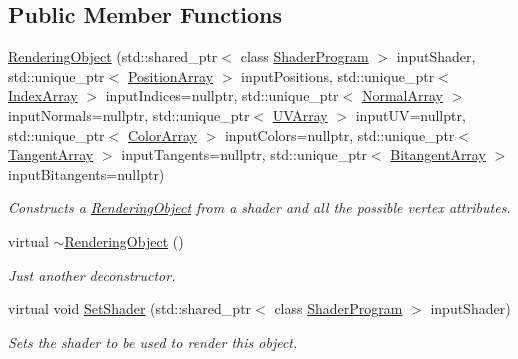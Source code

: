 \subsection*{Public Member Functions}
\begin{DoxyCompactItemize}
\item 
\hyperlink{class_rendering_object_ab5e3376ea0eb6290cdc55750a420b9d1}{Rendering\+Object} (std\+::shared\+\_\+ptr$<$ class \hyperlink{class_shader_program}{Shader\+Program} $>$ input\+Shader, std\+::unique\+\_\+ptr$<$ \hyperlink{class_rendering_object_a1223b9cf03f2029b9c43d71042c2a18e}{Position\+Array} $>$ input\+Positions, std\+::unique\+\_\+ptr$<$ \hyperlink{class_rendering_object_a9931c88bca3384065c6691dfe1e60af1}{Index\+Array} $>$ input\+Indices=nullptr, std\+::unique\+\_\+ptr$<$ \hyperlink{class_rendering_object_a327c4d892de8d6138fb59afa6d078257}{Normal\+Array} $>$ input\+Normals=nullptr, std\+::unique\+\_\+ptr$<$ \hyperlink{class_rendering_object_a504ecd45ebe36dfa5b78c46d64d9904a}{U\+V\+Array} $>$ input\+UV=nullptr, std\+::unique\+\_\+ptr$<$ \hyperlink{class_rendering_object_a8a12e1f9be788d99af6c089e1c600022}{Color\+Array} $>$ input\+Colors=nullptr, std\+::unique\+\_\+ptr$<$ \hyperlink{class_rendering_object_a45b53e911c2f0131aa10e89869d38944}{Tangent\+Array} $>$ input\+Tangents=nullptr, std\+::unique\+\_\+ptr$<$ \hyperlink{class_rendering_object_a6c6bf305a5f0f9ce1006f374c753c856}{Bitangent\+Array} $>$ input\+Bitangents=nullptr)
\begin{DoxyCompactList}\small\item\em Constructs a \hyperlink{class_rendering_object}{Rendering\+Object} from a shader and all the possible vertex attributes. \end{DoxyCompactList}\item 
virtual \hyperlink{class_rendering_object_ae4e8e14104ee3a587d10c9f90ec82048}{$\sim$\+Rendering\+Object} ()
\begin{DoxyCompactList}\small\item\em Just another deconstructor. \end{DoxyCompactList}\item 
virtual void \hyperlink{class_rendering_object_a22311d08bb7559f6b913afe314a5031e}{Set\+Shader} (std\+::shared\+\_\+ptr$<$ class \hyperlink{class_shader_program}{Shader\+Program} $>$ input\+Shader)
\begin{DoxyCompactList}\small\item\em Sets the shader to be used to render this object. \end{DoxyCompactList}\item 

\end{DoxyCompactItemize}

